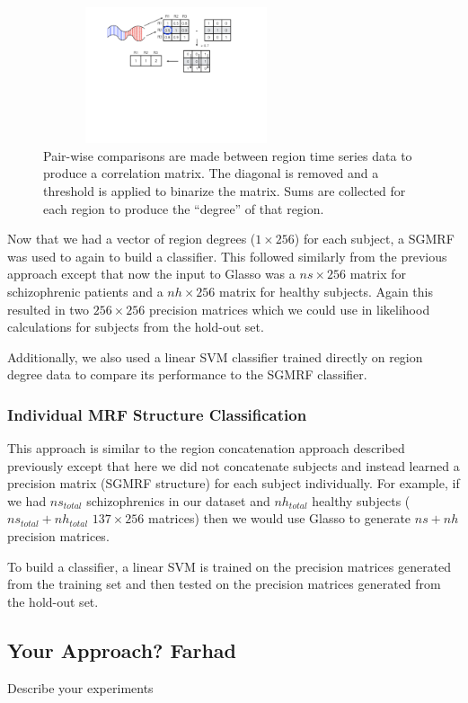 \documentclass{article} %
\begin{document}
\begin{figure}[!htb]
  \centering
  \includegraphics[width=0.7\textwidth, height=4.0cm]{diagrams/ROI_deg_img.pdf}
  \caption{Pair-wise comparisons are made between region time series data to
  produce a correlation matrix. The diagonal is removed and a threshold is
  applied to binarize the matrix. Sums are collected for each region to
  produce the ``degree'' of that region.}
  \label{fig:degree_calc}
\end{figure}

Now that we had a vector of region degrees ($1 \times 256$) for each subject,
a SGMRF was used to again to build a classifier. This followed similarly from
the previous approach except that now the input to Glasso was a $ns \times 256$
matrix for schizophrenic patients and a $nh \times256$ matrix for healthy
subjects. Again this resulted in two $256 \times 256$ precision matrices which
we could use in likelihood calculations for subjects from the hold-out set.

Additionally, we also used a linear SVM classifier trained directly on
region degree data to compare its performance to the SGMRF classifier.

\subsubsection{Individual MRF Structure Classification}
This approach is similar to the region concatenation approach described 
previously except that here we did not concatenate subjects and instead
learned a precision matrix (SGMRF structure) for each subject 
individually. For example, if we had $ns_{total}$ schizophrenics in our 
dataset and $nh_{total}$ healthy subjects ($ns_{total} + nh_{total}$ 
$137 \times 256$ matrices) then we would use Glasso to generate $ns + nh$ 
precision matrices.

To build a classifier, a linear SVM is trained on the precision matrices 
generated from the training set and then tested on the precision matrices 
generated from the hold-out set.

\subsection{Your Approach? Farhad}
Describe your experiments
\end{document}
